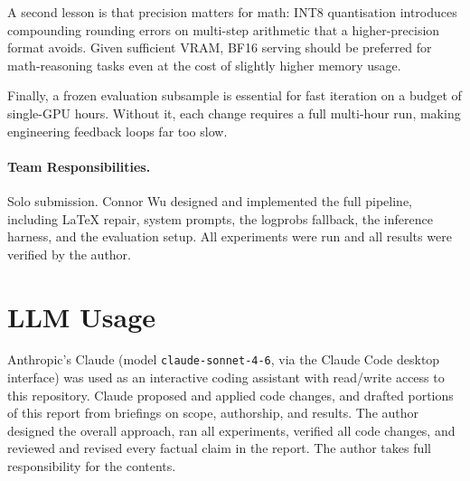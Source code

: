 \documentclass{article}
\begin{document}
A second lesson is that precision matters for math: INT8 quantisation
introduces compounding rounding errors on multi-step arithmetic that a
higher-precision format avoids.
Given sufficient VRAM, BF16 serving should be preferred for math-reasoning
tasks even at the cost of slightly higher memory usage.

Finally, a frozen evaluation subsample is essential for fast iteration on a
budget of single-GPU hours.
Without it, each change requires a full multi-hour run, making engineering
feedback loops far too slow.

\paragraph{Team Responsibilities.}
Solo submission.
Connor Wu designed and implemented the full pipeline, including LaTeX repair,
system prompts, the logprobs fallback, the inference harness, and the
evaluation setup.
All experiments were run and all results were verified by the author.


\section*{LLM Usage}

Anthropic's Claude (model \texttt{claude-sonnet-4-6}, via the Claude Code
desktop interface) was used as an interactive coding assistant with
read/write access to this repository.
Claude proposed and applied code changes, and drafted portions of this report
from briefings on scope, authorship, and results.
The author designed the overall approach, ran all experiments, verified all
code changes, and reviewed and revised every factual claim in the report.
The author takes full responsibility for the contents.




\end{document}
